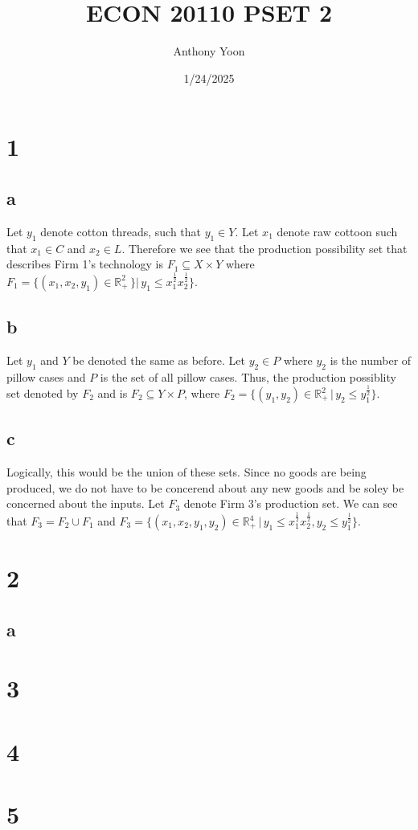 \documentclass[11pt]{article}
\title{ECON 20110 PSET 2}
\author{Anthony Yoon}
\date{1/24/2025}
\newcommand{\R}{\mathbb{R}}
\begin{document}
\maketitle

\section*{1}
\subsection*{a}
Let $y_1$ denote cotton threads, such that $y_1 \in Y$. Let $x_1$ denote raw cottoon such that $x_1 \in C$ and $x_2 \in L$. Therefore we see that the production possibility set that describes Firm 1's technology is $F_1 \subseteq X \times Y$ where $F_1 = \{ (x_1, x_2, y_1) \in \R^2_+ \hspace{2pt} \}| \hspace{2pt} y_1 \leq x^{\frac{1}{2}}_1 x^{\frac{1}{2}}_2 \}$. 
\subsection*{b}
Let $y_1$ and $Y$ be denoted the same as before. Let $y_2 \in P$ where $y_2$ is the number of pillow cases and $P$ is the set of all pillow cases. Thus, the production possiblity set denoted by $F_2$ and is $F_2 \subseteq Y \times P$, where $F_2 = \{ (y_1, y_2) \in \R^2_+ \hspace{2pt} | \hspace{2pt} y_2 \leq y_1^{\frac{1}{2}}\}$. 
\subsection*{c}
Logically, this would be the union of these sets. Since no goods are being produced, we do not have to be concerend about any new goods and be soley be concerned about the inputs. Let $F_3$ denote Firm 3's production set. We can see that $F_3 = F_2 \cup F_1$ and $F_3 = \{(x_1, x_2, y_1, y_2) \in \R^4_+ \hspace{2pt} | \hspace{2pt} y_1 \leq x_1^{\frac{1}{2}} x_2^{\frac{1}{2}}, y_2 \leq y_1^{\frac{1}{2}}\}$.
\section*{2}
\subsection*{a}

\section*{3}
\section*{4}
\section*{5}
\end{document}
